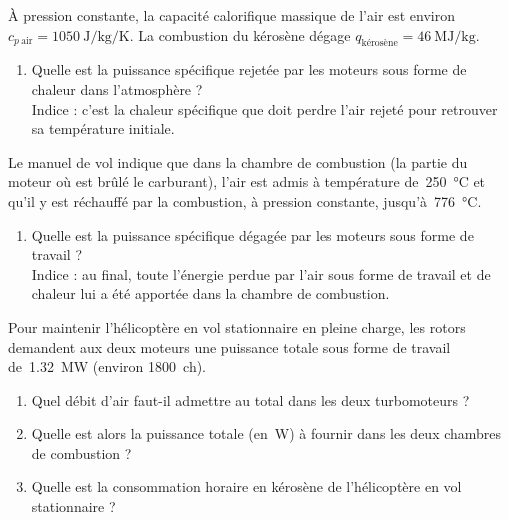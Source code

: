 	À pression constante, la capacité calorifique massique de l’air est environ $c_{p\ \text{air}} = \SI{1050}{\joule\per\kilogram\per\kelvin}$. La combustion du kérosène dégage $q_{\text{kérosène}} = \SI{46}{\mega\joule\per\kilogram}$.

	\begin{enumerate}
		\item Quelle est la puissance spécifique rejetée par les moteurs sous forme de chaleur dans l’atmosphère ?\\
			\scriptsize{Indice : c’est la chaleur spécifique que doit perdre l’air rejeté pour retrouver sa température initiale.}
	\end{enumerate}

	Le manuel de vol indique que dans la chambre de combustion (la partie du moteur où est brûlé le carburant), l’air est admis à température de~\SI{250}{\degreeCelsius} et qu’il y est réchauffé par la combustion, à pression constante, jusqu’à~\SI{776}{\degreeCelsius}.
	
	\begin{enumerate}
		\item Quelle est la puissance spécifique dégagée par les moteurs sous forme de travail ?\\
			\scriptsize{Indice : au final, toute l’énergie perdue par l’air sous forme de travail et de chaleur lui a été apportée dans la chambre de combustion.}
	\end{enumerate}
	
	Pour maintenir l’hélicoptère en vol stationnaire en pleine charge, les rotors demandent aux deux moteurs une puissance totale sous forme de travail de~\SI{1,32}{\mega\watt} (environ \SI{1800}{ch}).
	
	\begin{enumerate}
		\item Quel débit d’air faut-il admettre au total dans les deux turbomoteurs ?
		\item Quelle est alors la puissance totale (en~\si{\watt}) à fournir dans les deux chambres de combustion ?
		\item Quelle est la consommation horaire en kérosène de l’hélicoptère en vol stationnaire ?
	\end{enumerate}

\exercisesolutionpage
\titreresultats

